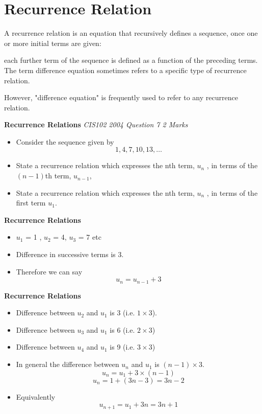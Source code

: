 \documentclass[12pt]{article}
\begin{document}
\section{Recurrence Relation}


A recurrence relation is an equation that recursively defines a sequence, once one or more initial terms are given: 

each further term of the sequence is defined as a function of the preceding terms.
The term difference equation sometimes refers to a specific type of recurrence relation. 

However, "difference equation" is frequently used to refer to any recurrence relation.




\noindent \textbf{Recurrence Relations}
\textit{CIS102 2004 Question 7 2 Marks}


\begin{itemize}
\item Consider the sequence given by \[ 1, 4, 7, 10, 13, \ldots\]
\item State a recurrence relation which expresses the nth term, $u_n$
, in terms of the$(n - 1)$th term, $u_{n-1}$, 
\item State a recurrence relation which expresses the nth term, $u_n$
, in terms of the first term $u_1$.
\end{itemize}



\noindent \textbf{Recurrence Relations}

\begin{itemize}
\item $u_1$ = 1 , $u_2$ = 4, $u_3$ = 7 etc 
\item Difference in successive terms is 3.
\item Therefore we can say 
\[ u_n = u_{n-1} + 3 \]
\end{itemize}


\noindent \textbf{Recurrence Relations}

\begin{itemize}
\item Difference between $u_2$ and $u_1$ is 3 (i.e. $1 \times 3$).
\item Difference between $u_3$ and $u_1$ is 6 (i.e. $2 \times 3$)
\item Difference between $u_4$ and $u_1$ is 9 (i.e. $3 \times 3$)
\item In general the difference between $u_n$ and $u_1$ is $(n-1)\times 3$.
\[ u_{n} = u_1 + 3 \times (n-1) \]
\[ u_{n} = 1 + (3n-3) = 3n-2\]
\item Equivalently
\[ u_{n+1} = u_1 + 3n = 3n+1\]
\end{itemize}
\end{document}
